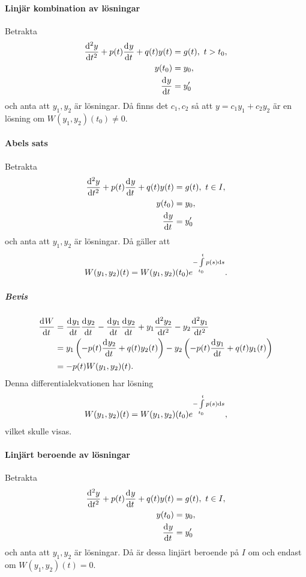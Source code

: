 \paragraph{Linjär kombination av lösningar}
Betrakta
\begin{align*}
	\dv[2]{y}{t} (t) + p(t)\dv[]{y}{t} (t) + q(t)y(t) &= g(t),\ t > t_0, \\
	y(t_0)                                              &= y_0, \\
	\dv[]{y}{t} (t_{0})                                 &= y'_{0}
\end{align*}
och anta att $y_{1}, y_{2}$ är lösningar. Då finns det $c_{1}, c_{2}$ så att $y = c_{1}y_{1} + c_{2}y_{2}$ är en lösning om $W(y_{1}, y_{2})(t_{0}) \neq 0$.

\paragraph{Abels sats}
Betrakta
\begin{align*}
	\deval[2]{y}{t}{t} + p(t)\deval{y}{t}{t} + q(t)y(t) &= g(t),\ t\in I, \\
	y(t_0)                                              &= y_0, \\
	\deval{y}{t}{t_{0}}                                 &= y'_{0}
\end{align*}
och anta att $y_{1}, y_{2}$ är lösningar. Då gäller att
\begin{align*}
	W(y_{1}, y_{2})(t) = W(y_{1}, y_{2})(t_{0})e^{-\int\limits_{t_{0}}^{t}p(s)\dd{s}}.
\end{align*}

\subparagraph{Bevis}
\begin{align*}
	\dv[]{W}{t} (t) &= \dv[]{y_{1}}{t} (t)\dv[]{y_{2}}{t} (t) - \dv[]{y_{1}}{t} (t)\dv[]{y_{2}}{t} (t) + y_{1}\dv[2]{y_{2}}{t} (t) - y_{2}\dv[2]{y_{1}}{t} (t) \\
	                &= y_{1}\left(-p(t)\dv[]{y_{2}}{t} (t) + q(t)y_{2}(t)\right) - y_{2}\left(-p(t)\dv[]{y_{1}}{t} (t) + q(t)y_{1}(t)\right) \\
	                &= -p(t)W(y_{1}, y_{2})(t).
\end{align*}
Denna differentialekvationen har lösning
\begin{align*}
	W(y_{1}, y_{2})(t) = W(y_{1}, y_{2})(t_{0})e^{-\int\limits_{t_{0}}^{t}p(s)\dd{s}},
\end{align*}
vilket skulle visas.

\paragraph{Linjärt beroende av lösningar}
Betrakta
\begin{align*}
	\deval[2]{y}{t}{t} + p(t)\deval{y}{t}{t} + q(t)y(t) &= g(t),\ t\in I, \\
	y(t_0)                                              &= y_0, \\
	\deval{y}{t}{t_{0}}                                 &= y'_{0}
\end{align*}
och anta att $y_{1}, y_{2}$ är lösningar. Då är dessa linjärt beroende på $I$ om och endast om $W(y_{1}, y_{2})(t) = 0$.

